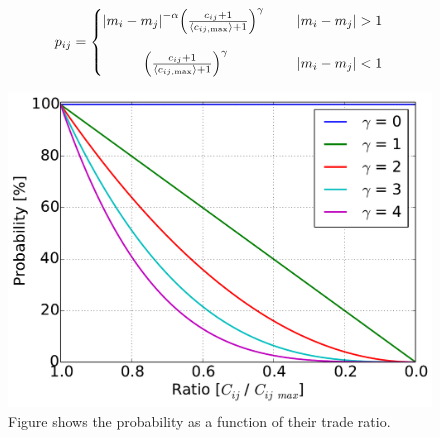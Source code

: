 \begin{align} 
p_{ij}=
\left\{\begin{matrix}
\abs{m_i-m_j}^{-\alpha}\qty(\frac{c_{ij}+1}{\langle c_{ij \mathrm{, max}}  \rangle + 1})^\gamma\ && |m_i-m_j|>1 \\ 
&&\\
\qty(\frac{c_{ij}+1}{\langle c_{ij \mathrm{, max}}\rangle +1})^\gamma &&|m_i-m_j|<1
\end{matrix}\right.\label{eq:EPICPROB2}
\end{align}

\begin{figure}[H]
\centering
\includegraphics[width=0.7\linewidth]{theory/bilder/interactions}
\caption{Figure shows the probability as a function of their trade ratio.}
\label{fig:interactions}
\end{figure}







